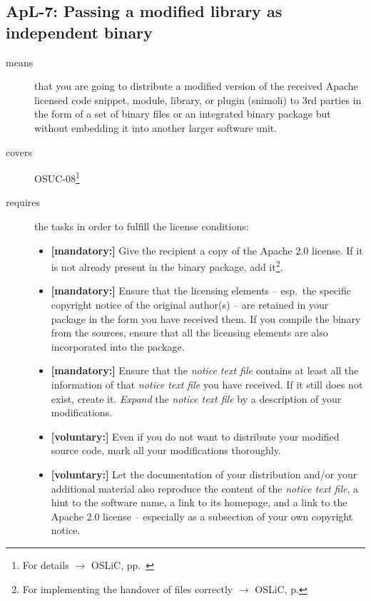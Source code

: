 \subsection{ApL-7: Passing a modified library as independent binary}

\begin{description}
\item[means] that you are going to distribute a modified version of the received
Apache licensed code snippet, module, library, or plugin (snimoli) to 3rd
parties in the form of a set of binary files or an integrated binary package but
without embedding it into another larger software unit.
\item[covers] OSUC-08\footnote{For details $\rightarrow$ OSLiC, pp.\ \pageref{OSUC-08-DEF}}
\item[requires] the tasks in order to fulfill the license conditions:
\begin{itemize}
  
 \item \textbf{[mandatory:]} Give the recipient a copy of the Apache 2.0
  license. If it is not already present in the binary package, add
  it\footnote{For implementing the handover of files correctly $\rightarrow$
  OSLiC, p. \pageref{DistributingFilesHint}}.
  
  \item \textbf{[mandatory:]} Ensure that the licensing elements -- esp.\ the
  specific copyright notice of the original author(s) -- are retained in your
  package in the form you have received them. If you compile the binary from the
  sources, ensure that all the licensing elements are also incorporated into the
  package.
  
  \item \textbf{[mandatory:]} Ensure that the \emph{notice text file} contains
  at least all the information of that \emph{notice text file} you have
  received. If it still does not exist, create it. \emph{Expand} the
  \emph{notice text file} by a description of your modifications.
   
  \item \textbf{[voluntary:]} Even if you do not want to distribute your
  modified source code, mark all your modifications thoroughly.
 
  \item \textbf{[voluntary:]} Let the documentation of your distribution and/or
  your additional material also reproduce the content of the \emph{notice text
  file}, a hint to the software name, a link to its homepage, and a link to the
  Apache 2.0 license -- especially as a subsection of your own copyright notice.
  

\end{itemize}
\end{description}
